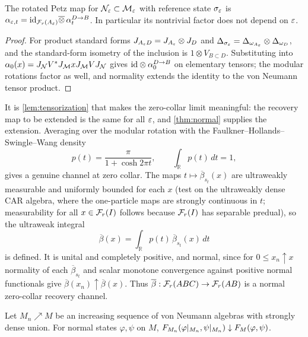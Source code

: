 \begin{lemma}\label{lem:tensorization}
The rotated Petz map for $\mathcal N_\varepsilon\subset\mathcal M_\varepsilon$ with reference state
$\sigma_\varepsilon$ is
$\alpha_{\varepsilon,t}=\mathrm{id}_{\mathcal F_r(A_\varepsilon)}\overline\otimes\,\alpha_t^{D\to B}$.  In
particular its nontrivial factor does not depend on $\varepsilon$.
\end{lemma}

\begin{proof}
For product standard forms $J_{A_\varepsilon D}=J_{A_\varepsilon}\otimes J_D$ and
$\Delta_{\sigma_\varepsilon}=\Delta_{\omega_{A_\varepsilon}}\otimes\Delta_{\omega_D}$, and the
standard-form isometry of the inclusion is $1\otimes V_{B\subset D}$.  Substituting
into $\alpha_0(x)=J_{\mathcal N}V^*J_{\mathcal M}xJ_{\mathcal M}VJ_{\mathcal N}$ gives
$\mathrm{id}\otimes\alpha_0^{D\to B}$ on elementary tensors; the modular rotations factor
as well, and normality extends the identity to the von Neumann tensor product.
\end{proof}

It is \cref{lem:tensorization} that makes the zero-collar limit meaningful: the
recovery map to be extended is the same for all $\varepsilon$, and \cref{thm:normal}
supplies the extension.  Averaging over the modular rotation with the
Faulkner--Hollands--Swingle--Wang density
\begin{equation}\label{eq:pt}
 p(t)=\frac{\pi}{1+\cosh2\pi t},\qquad \int_{\mathbb R}p(t)\,dt=1,
\end{equation}
gives a genuine channel at zero collar.  The maps
$t\mapsto\overline\beta_{s_t}(x)$ are ultraweakly measurable and uniformly bounded
for each $x$ (test on the ultraweakly dense CAR algebra, where the one-particle
maps are strongly continuous in $t$; measurability for all $x\in\mathcal F_r(I)$ follows
because $\mathcal F_r(I)$ has separable predual), so the ultraweak integral
\begin{equation}\label{eq:twirled}
 \overline\beta(x)=\int_{\mathbb R}p(t)\,\overline\beta_{s_t}(x)\,dt
\end{equation}
is defined.  It is unital and completely positive, and normal, since for
$0\le x_n\uparrow x$ normality of each $\overline\beta_{s_t}$ and scalar monotone
convergence against positive normal functionals give
$\overline\beta(x_n)\uparrow\overline\beta(x)$.  Thus
$\overline\beta:\mathcal F_r(ABC)\to\mathcal F_r(AB)$ is a normal zero-collar recovery channel.

\begin{lemma}\label{lem:fidbelow}
Let $M_n\nearrow M$ be an increasing sequence of von Neumann algebras with
strongly dense union.  For normal states $\varphi,\psi$ on $M$,
$F_{M_n}(\varphi|_{M_n},\psi|_{M_n})\downarrow F_M(\varphi,\psi)$.
\end{lemma}

